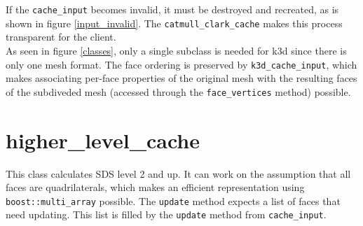 \documentclass[11pt]{article} %
\renewcommand{\[}{\begin{equation}}
\renewcommand{\]}{\end{equation}}
\renewcommand{\(}{\begin{displaymath}}
\renewcommand{\)}{\end{displaymath}}
\begin{document}
If the \texttt{cache\_input} becomes invalid, it must be destroyed and recreated, as is shown in figure \ref{input_invalid}. The \texttt{catmull\_clark\_cache} makes this process transparent for the client.\\
As seen in figure \ref{classes}, only a single subclass is needed for k3d since there is only one mesh format. The face ordering is preserved by \texttt{k3d\_cache\_input}, which makes associating per-face properties of the original mesh with the resulting faces of the subdiveded mesh (accessed through the \texttt{face\_vertices} method) possible.

\section{higher\_level\_cache}
This class calculates SDS level 2 and up. It can work on the assumption that all faces are quadrilaterals, which makes an efficient representation using \texttt{boost::multi\_array} possible. The \texttt{update} method expects a list of faces that need updating. This list is filled by the \texttt{update} method from \texttt{cache\_input}.
\end{document}
